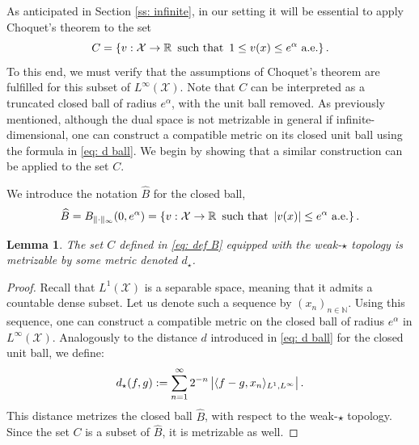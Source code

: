 \documentclass[a4paper, 11pt]{article}
\newtheorem{lem}{Lemma}
\theoremstyle{definition}
\newcommand{\theconvex}{C}
\DeclarePairedDelimiter{\abs}{\lvert}{\rvert}
\begin{document}
{As anticipated in Section \ref{ss: infinite}, in our setting it will be essential to apply Choquet’s theorem to the set
\begin{equation}{\label{eq: def B}}
  \theconvex = \left\{ v : \mathcal{X} \rightarrow \mathbb{R} \, \text{ such that } \, 1 \leq v(x) \leq e^\alpha \text{ a.e.} \right\}. 
\end{equation}
To this end, we must verify that the assumptions of Choquet's theorem are fulfilled for this subset of \( L^\infty(\mathcal{X}) \). Note that \( \theconvex \) can be interpreted as a truncated closed ball of radius \( e^\alpha \), with the unit ball removed. As previously mentioned, although the dual space is not metrizable in general if infinite-dimensional, one can construct a compatible metric on its closed unit ball using the formula in \eqref{eq: d ball}. We begin by showing that a similar construction can be applied to the set \( \theconvex \).

We introduce the notation $\widehat{B}$ for the closed ball, 
\begin{equation}\label{eq: def Ball L infty}
\widehat{B}=B_{\|\cdot\|_\infty}(0, e^{\alpha}) =\left\{ v : \mathcal{X} \rightarrow \mathbb{R} \, \text{ such that } \, \abs{ v(x)} \leq e^\alpha \text{ a.e.} \right\}.
\end{equation}

\begin{lem}{\label{l: B metrizable}}
The set $\theconvex$ defined in \eqref{eq: def B} equipped with the weak-$\star$ topology is metrizable by some metric denoted $d_\star$.  
\end{lem}
\begin{proof}
Recall that \( L^1(\mathcal{X}) \) is a separable space, meaning that it admits a countable dense subset. Let us denote such a sequence by \( (x_n)_{n \in \mathbb{N}} \). Using this sequence, one can construct a compatible metric on the closed ball of radius \( e^\alpha \) in \( L^\infty(\mathcal{X}) \). Analogously to the distance \( d \) introduced in \eqref{eq: d ball} for the closed unit ball, we define:
\begin{equation}{\label{eq: def dstar}}
d_\star(f, g) := \sum_{n = 1}^\infty 2^{-n} \left|\langle f - g, x_n \rangle_{L^1, L^\infty}\right|.   
\end{equation}
This distance metrizes the closed ball $\widehat{B}$,
with respect to the weak-\(\star\) topology. Since the set \( \theconvex \) is a subset of $\widehat{B}$, %
it is metrizable as well.
\end{proof}

}
\end{document}

